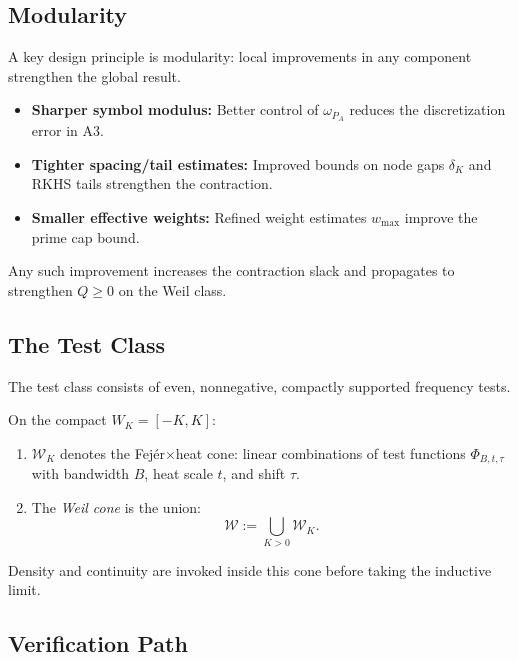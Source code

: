 \subsection{Modularity}

A key design principle is modularity: local improvements in any component strengthen the global result.

\begin{itemize}
  \item \textbf{Sharper symbol modulus:} Better control of $\omega_{P_A}$ reduces the discretization error in A3.

  \item \textbf{Tighter spacing/tail estimates:} Improved bounds on node gaps $\delta_K$ and RKHS tails strengthen the contraction.

  \item \textbf{Smaller effective weights:} Refined weight estimates $w_{\max}$ improve the prime cap bound.
\end{itemize}

Any such improvement increases the contraction slack and propagates to strengthen $Q \geq 0$ on the Weil class.

\subsection{The Test Class}

The test class consists of even, nonnegative, compactly supported frequency tests.

\begin{definition}\label{def:test-classes}
On the compact $W_K = [-K, K]$:
\begin{enumerate}
  \item[\textup{(i)}] $\mathcal{W}_K$ denotes the Fej\'er$\times$heat cone: linear combinations of test functions $\Phi_{B, t, \tau}$ with bandwidth $B$, heat scale $t$, and shift $\tau$.

  \item[\textup{(ii)}] The \emph{Weil cone} is the union:
  \begin{equation}
    \mathcal{W} := \bigcup_{K > 0} \mathcal{W}_K.
  \end{equation}
\end{enumerate}
Density and continuity are invoked inside this cone before taking the inductive limit.
\end{definition}

\subsection{Verification Path}

